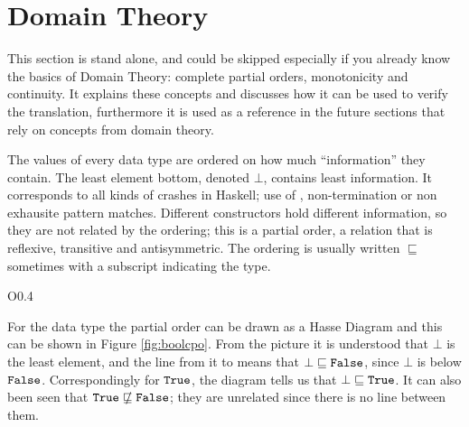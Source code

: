 \section{Domain Theory}
\label{sec:domaintheory}

This section is stand alone, and could be skipped especially if you
already know the basics of Domain Theory: comp\-lete partial orders,
monotonicity and continuity.
It explains these concepts and discusses how it can be
used to verify the translation, furthermore it is used as a reference
in the future sections that rely on concepts from domain theory.

The values of every data type are ordered on how much ``information''
they contain. The least element bottom, denoted $\bot$, contains least
information. It corresponds to all kinds of crashes in Haskell; use of
, non-termination or non exhausite pattern matches.
Different constructors hold different information, so they are not
related by the ordering; this is a partial order, a relation that is
reflexive, transitive and antisymmetric. The ordering is usually
written $\sqsubseteq$ sometimes with a subscript indicating the type.

\begin{wrapfigure}{O}{0.4\textwidth} %
\vspace{-7pt}
\centering 
\vspace{-7pt}
\caption{
    The order of Bool values.
    \label{fig:boolcpo}
}
\end{wrapfigure}
For the  data type the partial order can be drawn as a Hasse
Diagram and this can be shown in Figure \ref{fig:boolcpo}.  From the
picture it is understood that $\bot$ is the least element, and the
line from it to  means that $\bot \sqsubseteq \hs{False}$,
since $\bot$ is below $\hs{False}$. Correspondingly for $\hs{True}$,
the diagram tells us that $\bot \sqsubseteq \hs{True}$. It can also
been seen that $\hs{True} \nsqsubseteq \hs{False}$; they are unrelated
since there is no line between them.

%


